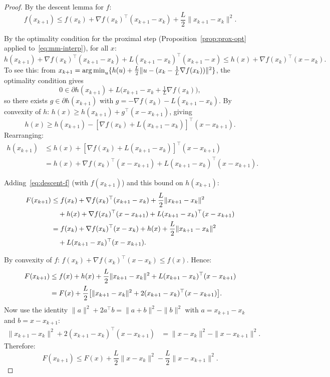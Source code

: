 \documentclass[11pt,a4paper]{article}
\begin{document}
\begin{proof}
By the descent lemma for $f$:
\begin{equation}\label{eq:descent-f}
  f(x_{k+1}) \le f(x_k) + \nabla f(x_k)^\top(x_{k+1} - x_k)
  + \frac{L}{2}\|x_{k+1} - x_k\|^2.
\end{equation}

By the optimality condition for the proximal step
(Proposition~\ref{prop:prox-opt} applied to~\eqref{eq:mm-interp}),
for all $x$:
\begin{equation}\label{eq:prox-opt-applied}
  h(x_{k+1}) + \nabla f(x_k)^\top(x_{k+1} - x_k)
  + L(x_{k+1} - x_k)^\top(x_{k+1} - x)
  \le h(x) + \nabla f(x_k)^\top(x - x_k).
\end{equation}
To see this: from $x_{k+1} = \operatorname{arg\,min}_u \{h(u) + \frac{L}{2}\|u - (x_k
- \frac{1}{L}\nabla f(x_k))\|^2\}$, the optimality condition gives
\[
  0 \in \partial h(x_{k+1}) + L\bigl(x_{k+1} - x_k + \tfrac{1}{L}
  \nabla f(x_k)\bigr),
\]
so there exists $g \in \partial h(x_{k+1})$ with
$g = -\nabla f(x_k) - L(x_{k+1} - x_k)$. By convexity of $h$:
$h(x) \ge h(x_{k+1}) + g^\top(x - x_{k+1})$, giving
\[
  h(x) \ge h(x_{k+1}) - [\nabla f(x_k) + L(x_{k+1} - x_k)]^\top
  (x - x_{k+1}).
\]
Rearranging:
\begin{align*}
  h(x_{k+1}) &\le h(x) + [\nabla f(x_k) + L(x_{k+1} - x_k)]^\top
  (x - x_{k+1}) \\
  &= h(x) + \nabla f(x_k)^\top(x - x_{k+1})
    + L(x_{k+1} - x_k)^\top(x - x_{k+1}).
\end{align*}

Adding~\eqref{eq:descent-f} (with $f(x_{k+1})$) and this bound on
$h(x_{k+1})$:
\begin{align}
  F(x_{k+1}) &\le f(x_k) + \nabla f(x_k)^\top(x_{k+1} - x_k)
  + \frac{L}{2}\|x_{k+1} - x_k\|^2 \notag \\
  &\quad + h(x) + \nabla f(x_k)^\top(x - x_{k+1})
  + L(x_{k+1} - x_k)^\top(x - x_{k+1}) \notag \\
  &= f(x_k) + \nabla f(x_k)^\top(x - x_k) + h(x)
  + \frac{L}{2}\|x_{k+1} - x_k\|^2 \notag \\
  &\quad + L(x_{k+1} - x_k)^\top(x - x_{k+1}). \label{eq:Fk1-bound}
\end{align}

By convexity of $f$: $f(x_k) + \nabla f(x_k)^\top(x - x_k) \le f(x)$.
Hence:
\begin{align}
  F(x_{k+1}) &\le f(x) + h(x) + \frac{L}{2}\|x_{k+1} - x_k\|^2
  + L(x_{k+1} - x_k)^\top(x - x_{k+1}) \notag \\
  &= F(x) + \frac{L}{2}\bigl[\|x_{k+1} - x_k\|^2
    + 2(x_{k+1} - x_k)^\top(x - x_{k+1})\bigr]. \label{eq:almost-done}
\end{align}
Now use the identity $\|a\|^2 + 2a^\top b = \|a + b\|^2 - \|b\|^2$
with $a = x_{k+1} - x_k$ and $b = x - x_{k+1}$:
\begin{align*}
  \|x_{k+1} - x_k\|^2 + 2(x_{k+1} - x_k)^\top(x - x_{k+1})
  &= \|x - x_k\|^2 - \|x - x_{k+1}\|^2.
\end{align*}
Therefore:
\begin{equation}\label{eq:suff-dec-result}
  F(x_{k+1}) \le F(x) + \frac{L}{2}\|x - x_k\|^2
  - \frac{L}{2}\|x - x_{k+1}\|^2.
\end{equation}


\end{proof}
\end{document}
